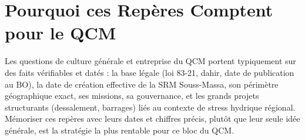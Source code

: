 \section{Pourquoi ces Repères Comptent pour le QCM}
Les questions de culture générale et entreprise du QCM portent typiquement sur des faits vérifiables et datés : la base légale (loi 83-21, dahir, date de publication au BO), la date de création effective de la SRM Souss-Massa, son périmètre géographique exact, ses missions, sa gouvernance, et les grands projets structurants (dessalement, barrages) liés au contexte de stress hydrique régional. Mémoriser ces repères avec leurs dates et chiffres précis, plutôt que leur seule idée générale, est la stratégie la plus rentable pour ce bloc du QCM.
